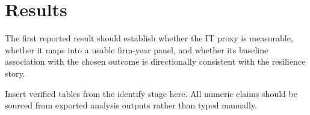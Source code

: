 \section{Results}

The first reported result should establish whether the IT proxy is measurable, whether it maps into a usable firm-year panel, and whether its baseline association with the chosen outcome is directionally consistent with the resilience story.

Insert verified tables from the identify stage here. All numeric claims should be sourced from exported analysis outputs rather than typed manually.
